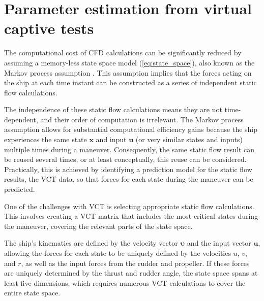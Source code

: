 \section{Parameter estimation from virtual captive tests} \label{sec:VCT}
The computational cost of CFD calculations can be significantly reduced by assuming a memory-less state space model (\autoref{eq:state_space}), also known as the Markov process assumption \cite{yoonIdentificationHydrodynamicCoefficients2003}. This assumption implies that the forces acting on the ship at each time instant can be constructed as a series of independent static flow calculations.

The independence of these static flow calculations means they are not time-dependent, and their order of computation is irrelevant. The Markov process assumption allows for substantial computational efficiency gains because the ship experiences the same state $\mathbf{x}$ and input $\mathbf{u}$ (or very similar states and inputs) multiple times during a maneuver. Consequently, the same static flow result can be reused several times, or at least conceptually, this reuse can be considered. Practically, this is achieved by identifying a prediction model for the static flow results, the VCT data, so that forces for each state during the maneuver can be predicted.

One of the challenges with VCT is selecting appropriate static flow calculations. This involves creating a VCT matrix that includes the most critical states during the maneuver, covering the relevant parts of the state space.

The ship's kinematics are defined by the velocity vector $\pmb{\bm{\upsilon}}$ and the input vector $\mathbf{u}$, allowing the forces for each state to be uniquely defined by the velocities $u$, $v$, and $r$, as well as the input forces from the rudder and propeller. If these forces are uniquely determined by the thrust and rudder angle, the state space spans at least five dimensions, which requires numerous VCT calculations to cover the entire state space.

